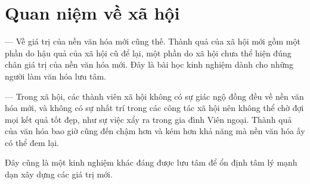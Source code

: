 \section{Quan niệm về xã hội} %
\label{sec:96_97_xa_hoi}

--- Về giá trị của nền văn hóa mới cũng thế. Thành quả của xã hội mới gồm một phần do hậu quả của xã hội cũ để lại, một phần do xã hội chưa thể hiện đúng chân giá trị của nền văn hóa mới. Đây là bài học kinh nghiệm dành cho những người làm văn hóa lưu tâm.

--- Trong xã hội, các thành viên xã hội không có sự giác ngộ đồng đều về nền văn hóa mới, và không có sự nhất trí trong các công tác xã hội nên không thể chờ đợi mọi kết quả tốt đẹp, như sự việc xẩy ra trong gia đình Viên ngoại. Thành quả của văn hóa bao giờ cũng đến chậm hơn và kém hơn khả năng mà nền văn hóa ấy có thể đem lại.

Đây cũng là một kinh nghiệm khác đáng được lưu tâm để ổn định tâm lý mạnh dạn xây dựng các giá trị mới.
